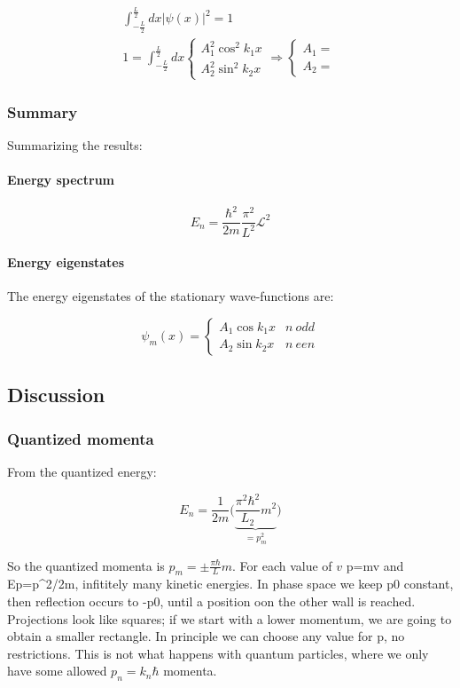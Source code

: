     \begin{align*}
      \int_{-\frac{L}{2}}^{\frac{L}{2}} dx|\psi(x)|^2 = 1\\
      1 = \int_{-\frac{L}{2}}^{\frac{L}{2}} dx\begin{cases}A_1^2\cos^2k_1x\\A_2^2\sin^2 k_2x\end{cases}\Rightarrow\begin{cases}A_1 = \\A_2 = \end{cases}
    \end{align*}

    \subsubsection{Summary}
    Summarizing the results:

      \paragraph{Energy spectrum}

      $$E_n = \frac{\hbar^2}{2m}\frac{\pi^2}{L^2}\mathcal{L}^2$$

      \paragraph{Energy eigenstates}
      The energy eigenstates of the stationary wave-functions are:

      $$\psi_m(x) = \begin{cases}A_1\cos k_1 x & n\ odd\\ A_2\sin k_2 x & n\ een\end{cases}$$
      

  \subsection{Discussion}

    \subsubsection{Quantized momenta}
    From the quantized energy:

    $$E_n = \frac{1}{2m}\biggl(\underbrace{\frac{\pi^2\hbar^2}{L_2}m^2}_{=p_m^2}\biggr)$$

    So the quantized momenta is $p_m = \pm \frac{\pi\hbar}{L}m$.
    For each value of $v$ p=mv and Ep=p^2/2m, infititely many kinetic energies. In phase space we keep p0 constant, then reflection occurs to -p0, until a position oon the other wall is reached. Projections look like squares; if we start with a lower momentum, we are going to obtain a smaller rectangle. In principle we can choose any value for p, no restrictions. This is not what happens with quantum particles, where we only have some allowed $p_n=k_n\hbar$ momenta.
    
